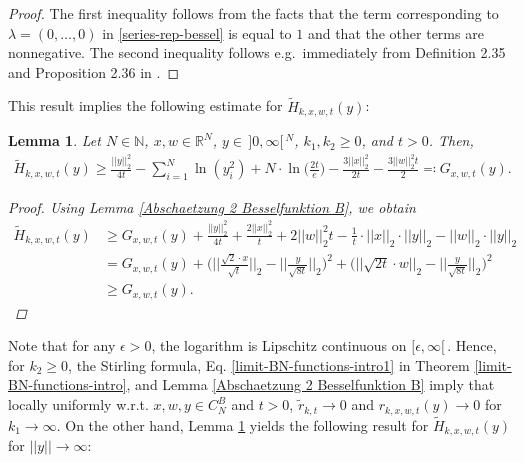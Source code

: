 \documentclass[reqno]{amsart}
\theoremstyle{plain}
\newtheorem{lemma}[theorem]{Lemma}
\theoremstyle{definition}
\numberwithin{equation}{section}
\newcommand{\R}{\mathbb{R}}
\newcommand{\N}{\mathbb{N}}
\newcommand{\ra}{\rightarrow}
\begin{document}
\begin{proof} The first inequality follows from the facts that the term corresponding to $\lambda=(0,\ldots,0)$ in \eqref{series-rep-bessel} is equal to $1$ and that the other terms are nonnegative. The second inequality follows e.g.~immediately from
 Definition 2.35 and Proposition 2.36 in \cite{R3}.
\end{proof}

This result implies the following estimate for $\widetilde{H}_{k,x,w,t}(y)$:

\begin{lemma}\label{Abschaetzung H}
Let $N \in \N$, $x,w \in \R^N$, $y \in \,]0,\infty[\,^N$, $k_1,k_2 \geq 0$, and $t>0$. Then,
\begin{align*}
\widetilde{H}_{k,x,w,t}(y) 
\geq \frac{||y||_2^2}{4t}-\sum\limits_{i=1}^N \ln(y^2_i)+N \cdot \ln\Big( \frac{2t}{e} \Big) - \frac{3 ||x||_2^2}{2t} - \frac{3 ||w||_2^2 t}{2}
\eqqcolon G_{x,w,t}(y).
\end{align*}
\begin{proof}
Using Lemma \ref{Abschaetzung 2 Besselfunktion B}, we obtain
\begin{align*}
\widetilde{H}_{k,x,w,t}(y) &\geq G_{x,w,t}(y) + \frac{||y||_2^2}{4t} + \frac{2 ||x||_2^2}{t} + 2 ||w||_2^2t - \frac{1}{t} \cdot ||x||_2 \cdot ||y||_2 - ||w||_2 \cdot ||y||_2 \\
&= G_{x,w,t}(y) + \Big( \Big|\Big|\frac{\sqrt{2} \cdot x}{\sqrt{t}}\Big|\Big|_2 - \Big|\Big|\frac{y}{\sqrt{8t}}\Big|\Big|_2 \Big)^2 + \Big( ||\sqrt{2t} \cdot w||_2 - \Big|\Big|\frac{y}{\sqrt{8t}}\Big|\Big|_2 \Big)^2 \\
&\geq G_{x,w,t}(y).
\end{align*}
\end{proof}
\end{lemma}






Note that for any $\epsilon>0$, the logarithm is Lipschitz continuous on $[\epsilon,\infty[\,$.
Hence, for $k_2 \geq 0$, the Stirling formula, Eq. \eqref{limit-BN-functions-intro1} in Theorem \ref{limit-BN-functions-intro}, 
and Lemma \ref{Abschaetzung 2 Besselfunktion B} imply that
locally uniformly w.r.t. $x,w,y \in C_N^B$ and $t>0$,
$\widetilde{r}_{k,t} \to 0$ and $r_{k,x,w,t}(y) \to 0$ for $k_1 \to \infty$.
On the other hand, Lemma \ref{Abschaetzung H} yields the following result for
$\widetilde{H}_{k,x,w,t}(y)$ for $||y|| \ra \infty$:
\end{document}
